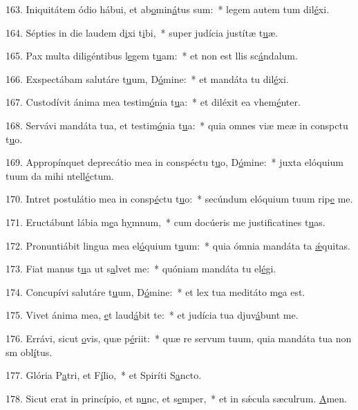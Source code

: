 163. Iniquitátem ódio hábui, et ab\uline{o}min\uline{á}tus sum:~* legem autem tum dil\uline{é}xi.\par 
164. Sépties in die laudem d\uline{i}xi t\uline{i}bi,~* super judícia justítæ t\uline{u}æ.\par 
165. Pax multa diligéntibus l\uline{e}gem t\uline{u}am:~* et non est llis sc\uline{á}ndalum.\par 
166. Exspectábam salutáre t\uline{u}um, D\uline{ó}mine:~* et mandáta tu dil\uline{é}xi.\par 
167. Custodívit ánima mea testim\uline{ó}nia t\uline{u}a:~* et diléxit ea vhem\uline{é}nter.\par 
168. Servávi mandáta tua, et testim\uline{ó}nia t\uline{u}a:~* quia omnes viæ meæ in conspctu t\uline{u}o.\par 
169. Appropínquet deprecátio mea in conspéctu t\uline{u}o, D\uline{ó}mine:~* juxta elóquium tuum da mihi ntell\uline{é}ctum.\par 
170. Intret postulátio mea in consp\uline{é}ctu t\uline{u}o:~* secúndum elóquium tuum rip\uline{e} me.\par 
171. Eructábunt lábia m\uline{e}a h\uline{y}mnum,~* cum docúeris me justificatines t\uline{u}as.\par 
172. Pronuntiábit lingua mea el\uline{ó}quium t\uline{u}um:~* quia ómnia mandáta ta \uline{ǽ}quitas.\par 
173. Fiat manus t\uline{u}a ut s\uline{a}lvet me:~* quóniam mandáta tu el\uline{é}gi.\par 
174. Concupívi salutáre t\uline{u}um, D\uline{ó}mine:~* et lex tua meditáto m\uline{e}a est.\par 
175. Vivet ánima mea, \uline{e}t laud\uline{á}bit te:~* et judícia tua djuv\uline{á}bunt me.\par 
176. Errávi, sicut \uline{o}vis, quæ p\uline{é}riit:~* quæ re servum tuum, quia mandáta tua non sm obl\uline{í}tus.\par 
177. Glória P\uline{a}tri, et F\uline{í}lio,~* et Spiríti S\uline{a}ncto.\par 
178. Sicut erat in princípio, et n\uline{u}nc, et s\uline{e}mper,~* et in sǽcula sæculrum. \uline{A}men.\par 
